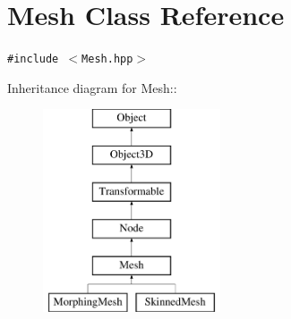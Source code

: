 \hypertarget{classm3g_1_1Mesh}{
\section{Mesh Class Reference}
\label{classm3g_1_1Mesh}
}
{\tt \#include $<$Mesh.hpp$>$}

Inheritance diagram for Mesh::\begin{figure}[H]
\begin{center}
\leavevmode
\includegraphics[height=6cm]{classm3g_1_1Mesh}
\end{center}
\end{figure}
